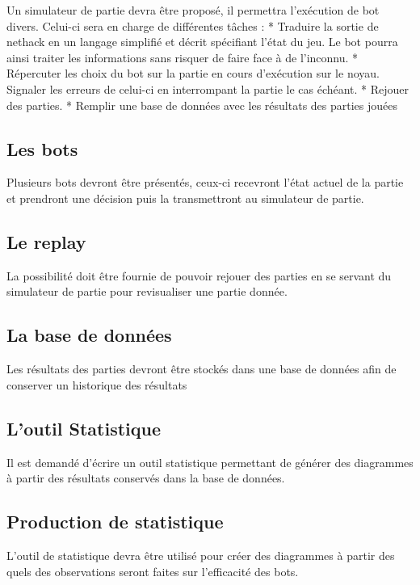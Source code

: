 \documentclass[12pt]{article}
\begin{document}
Un simulateur de partie devra être proposé, il permettra l'exécution de
bot divers. Celui-ci sera en charge de différentes tâches : * Traduire
la sortie de nethack en un langage simplifié et décrit spécifiant l'état
du jeu. Le bot pourra ainsi traiter les informations sans risquer de
faire face à de l'inconnu. * Répercuter les choix du bot sur la partie
en cours d'exécution sur le noyau. Signaler les erreurs de celui-ci en
interrompant la partie le cas échéant. * Rejouer des parties. * Remplir
une base de données avec les résultats des parties jouées

\subsection{Les bots}

Plusieurs bots devront être présentés, ceux-ci recevront l'état actuel
de la partie et prendront une décision puis la transmettront au
simulateur de partie.

\subsection{Le replay}

La possibilité doit être fournie de pouvoir rejouer des parties en se
servant du simulateur de partie pour revisualiser une partie donnée.

\subsection{La base de données}

Les résultats des parties devront être stockés dans une base de données
afin de conserver un historique des résultats

\subsection{L'outil Statistique}

Il est demandé d'écrire un outil statistique permettant de générer des
diagrammes à partir des résultats conservés dans la base de données.

\subsection{Production de statistique}

L'outil de statistique devra être utilisé pour créer des diagrammes à
partir des quels des observations seront faites sur l'efficacité des
bots.
\end{document}
